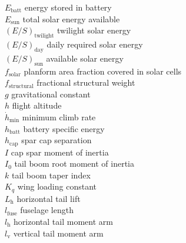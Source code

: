 \begin{multicols}{2}
\begin{tabbing}
$E_{\text{batt}}$ \> energy stored in battery \\ %
$E_{\text{sun}}$ \> total solar energy available \\ %
$(E/S)_{\text{twilight}}$ \> twilight solar energy \\ %
$(E/S)_{\text{day}}$ \> daily required solar energy \\ %
$(E/S)_{\text{sun}}$ \> available solar energy \\ %
$f_{\text{solar}}$ \> planform area fraction covered in solar cells \\
$f_{\text{structural}}$ \> fractional structural weight\\
$g$ \> gravitational constant \\ %
$h$ \> flight altitude \\ %
$\dot{h}_{\text{min}}$ \> minimum climb rate \\ %
$h_{\text{batt}}$ \> battery specific energy \\ %
$h_{\text{cap}}$ \> spar cap separation \\ %
$I$ \> cap spar moment of inertia \\ %
$I_0$ \> tail boom root moment of inertia \\ %
$k$ \> tail boom taper index \\
$K_q$ \> wing loading constant \\ %
$L_\text{h}$ \> horizontal tail lift \\ %
$l_\text{fuse}$ \> fuselage length \\ %
$l_\text{h}$ \> horizontal tail moment arm \\ %
$l_\text{v}$ \> vertical tail moment arm \\ %

\end{tabbing}
\end{multicols}
